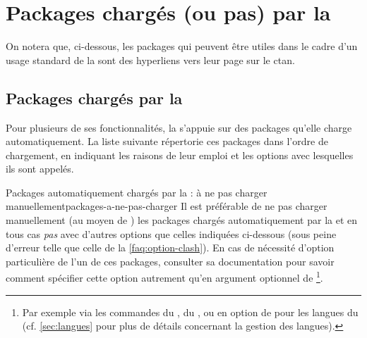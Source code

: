 \chapter{Packages chargés (ou pas) par la \yatcl}\label{cha:packages-charges}

On notera que, ci-dessous, les packages qui peuvent être utiles dans le cadre
d'un usage standard de la \yatcl{} sont des hyperliens vers leur page sur le
\gls{ctan}.

\section{Packages chargés par la \yatcl{}}
\label{sec:packages-charges-par}

Pour plusieurs de ses fonctionnalités, la \yatcl s'appuie sur des packages
qu'elle charge automatiquement. La liste suivante répertorie ces packages dans
l'ordre de chargement, en indiquant les raisons de leur emploi et les options
avec lesquelles ils sont appelés.

\begin{dbwarning}{Packages automatiquement chargés par la \yatcl{} : à ne pas
    charger manuellement}{packages-a-ne-pas-charger}
  Il est préférable de ne pas charger manuellement (au moyen de
  ) les packages chargés automatiquement par la
  \yatcl{} et en tous cas \emph{pas} avec d'autres options que celles indiquées
  ci-dessous (sous peine d'erreur telle que celle de la
  \vref{faq:option-clash}). En cas de nécessité d'option particulière de l'un
  de ces packages, consulter sa documentation pour savoir comment spécifier
  cette option autrement qu'en argument optionnel de
  \footnote{Par exemple via les commandes
     du ,
     du , ou en option de
     pour les langues du 
    (cf. \vref{sec:langues} pour plus de détails concernant la gestion des
    langues).}.
\end{dbwarning}

